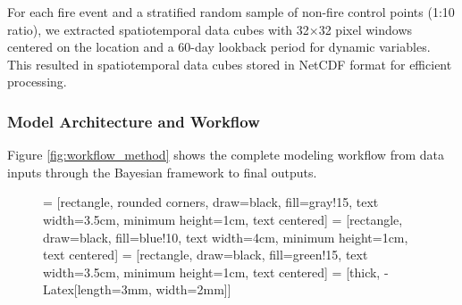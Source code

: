 \documentclass[11pt,a4paper]{article}
\begin{document}
For each fire event and a stratified random sample of non-fire control points (1:10 ratio), we extracted spatiotemporal data cubes with 32×32 pixel windows centered on the location and a 60-day lookback period for dynamic variables. This resulted in spatiotemporal data cubes stored in NetCDF format for efficient processing.

\subsubsection{Model Architecture and Workflow}

Figure \ref{fig:workflow_method} shows the complete modeling workflow from data inputs through the Bayesian framework to final outputs.

\begin{figure}[H]
\centering
{} = [rectangle, rounded corners, draw=black, fill=gray!15,
                    text width=3.5cm, minimum height=1cm, text centered]
 = [rectangle, draw=black, fill=blue!10,
                       text width=4cm, minimum height=1cm, text centered]
 = [rectangle, draw=black, fill=green!15,
                      text width=3.5cm, minimum height=1cm, text centered]
 = [thick, -{Latex[length=3mm, width=2mm]}]

\end{figure}
\end{document}

